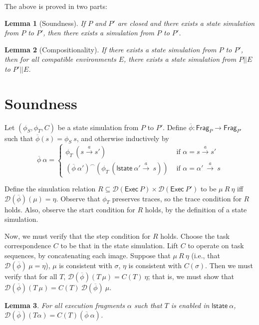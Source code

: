 \documentclass{article}
\newcommand{\Exec}{\mathsf{Exec}}
\newcommand{\Frag}{\mathsf{Frag}}
\newcommand{\lst}{\mathsf{lstate}}
\newcommand{\D}{\mathcal{D}}
\newtheorem{lemma}{Lemma}
\begin{document}
The above is proved in two parts:
\begin{lemma}[Soundness]
    If $P$ and $P'$ are closed and there exists a state simulation from $P$ to $P'$, then there exists a simulation from $P$ to $P'$.
\end{lemma}

\begin{lemma}[Compositionality]
    If there exists a state simulation from $P$ to $P'$, then for all compatible environments $E$, there exists a state simulation from $P || E$ to $P' || E$.
\end{lemma}

\section{Soundness}

Let $(\phi_S, \phi_T, C)$ be a state simulation from $P$ to $P'$. Define $\overline{\phi} : \Frag_P \to \Frag_{P'}$ such that $\overline{\phi}(s) = \phi_S\ s$, and otherwise inductively by 
\[\overline{\phi}\ \alpha = \begin{cases}
        \phi_T\ (s \xrightarrow{a} s') & \text{ if $\alpha = s \xrightarrow{a} s'$ } \\
        (\overline{\phi}\ \alpha')^\frown (\phi_T\ (\lst\ \alpha' \xrightarrow{a}\ s)) & \text{ if $\alpha = \alpha'\ \xrightarrow{a}\ s$}
    \end{cases} \]

Define the simulation relation $R \subseteq \D(\Exec\ P) \times \D(\Exec\ P')$ to be $\mu\ R\ \eta$ iff $\D(\overline{\phi})(\mu) = \eta$. Observe that $\phi_T$ preserves traces, so the trace condition for $R$ holds. Also, observe the start condition for $R$ holds, by the definition of a state simulation.

Now, we must verify that the step condition for $R$ holds. Choose the task correspondence $C$ to be that in the state simulation. Lift $C$ to operate on task sequences, by concatenating each image. Suppose that $\mu\ R\ \eta$ (i.e., that $\D(\overline{\phi})\ \mu = \eta$), $\mu$ is consistent with $\sigma$, $\eta$ is consistent with $C(\sigma)$. Then we must verify that for all $T$, $\D(\overline{\phi})(T\ \mu) = C(T)\ \eta$; that is, we must show that $\D(\overline{\phi})(T\ \mu) = C(T)\ \D(\overline{\phi})\ \mu$.

\begin{lemma}
    For all execution fragments $\alpha$ such that $T$ is enabled in $\lst\ \alpha$, $\D(\overline{\phi})(T \alpha) = C(T) (\overline{\phi}\ \alpha)$.
\end{lemma}
\end{document}
